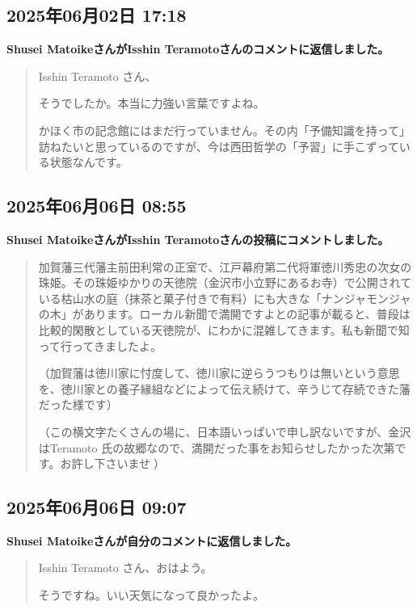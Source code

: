 \subsection*{2025年06月02日 17:18}

\textbf{Shusei MatoikeさんがIsshin Teramotoさんのコメントに返信しました。}

\begin{quote}
Isshin Teramoto さん、

そうでしたか。本当に力強い言葉ですよね。

かほく市の記念館にはまだ行っていません。その内「予備知識を持って」訪ねたいと思っているのですが、今は西田哲学の「予習」に手こずっている状態なんです。
\end{quote}

\subsection*{2025年06月06日 08:55}

\textbf{Shusei MatoikeさんがIsshin Teramotoさんの投稿にコメントしました。}

\begin{quote}
加賀藩三代藩主前田利常の正室で、江戸幕府第二代将軍徳川秀忠の次女の珠姫。その珠姫ゆかりの天徳院（金沢市小立野にあるお寺）で公開されている枯山水の庭（抹茶と菓子付きで有料）にも大きな「ナンジャモンジャの木」があります。ローカル新聞で満開ですよとの記事が載ると、普段は比較的閑散としている天徳院が、にわかに混雑してきます。私も新聞で知って行ってきましたよ。

（加賀藩は徳川家に忖度して、徳川家に逆らうつもりは無いという意思を、徳川家との養子縁組などによって伝え続けて、辛うじて存続できた藩だった様です）

（この横文字たくさんの場に、日本語いっぱいで申し訳ないですが、金沢はTeramoto 氏の故郷なので、満開だった事をお知らせしたかった次第です。お許し下さいませ🙏）
\end{quote}

\subsection*{2025年06月06日 09:07}

\textbf{Shusei Matoikeさんが自分のコメントに返信しました。}

\begin{quote}
Isshin Teramoto さん、おはよう。

そうですね。いい天気になって良かったよ。
\end{quote}

